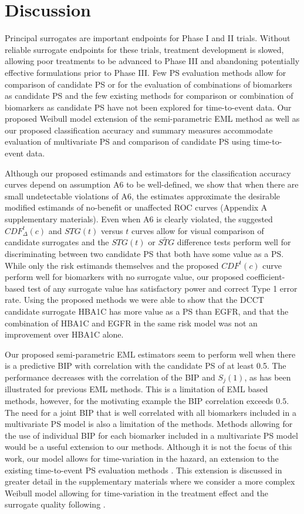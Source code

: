 \documentclass[times, doublespace]{simauth}
\begin{document}
\section{Discussion}
Principal surrogates are important endpoints for Phase I and II trials. Without reliable surrogate endpoints for these trials, treatment development is slowed, allowing poor treatments to be advanced to Phase III and abandoning potentially effective formulations prior to Phase III. Few PS evaluation methods allow for comparison of candidate PS or for the evaluation of combinations of biomarkers as candidate PS and the few existing methods for comparison or combination of biomarkers as candidate PS have not been explored for time-to-event data. Our proposed Weibull model extension of the \citet{Huang11} semi-parametric EML method as well as our proposed classification accuracy and summary measures accommodate evaluation of multivariate PS and comparison of candidate PS using time-to-event data. 

Although our proposed estimands and estimators for the classification accuracy curves depend on assumption A6 to be well-defined, we show that when there are small undetectable violations of A6, the estimates approximate the desirable modified estimands of no-benefit or unaffected ROC curves (Appendix A supplementary materials). Even when A6 is clearly violated, the suggested $CDF^{t}_{\Delta}(c)$ and $STG(t)$ versus $t$ curves allow for visual comparison of candidate surrogates and the $STG(t)$ or $\widetilde{STG}$ difference tests perform well for discriminating between two candidate PS that both have some value as a PS. While only the risk estimands themselves and the proposed $CDF^{t}(c)$ curve perform well for biomarkers with no surrogate value, our proposed coefficient-based test of any surrogate value has satisfactory power and correct Type 1 error rate. Using the proposed methods we were able to show that the DCCT candidate surrogate HBA1C has more value as a PS than EGFR, and that the combination of HBA1C and EGFR in the same risk model was not an improvement over HBA1C alone.

Our proposed semi-parametric EML estimators seem to perform well when there is a predictive BIP with correlation with the candidate PS of at least 0.5. The performance decreases with the correlation of the BIP and $S_j(1)$, as has been illustrated for previous EML methods. This is a limitation of EML based methods, however, for the motivating example the BIP correlation exceeds $0.5$. The need for a joint BIP that is well correlated with all biomarkers included in a multivariate PS model is also a limitation of the methods. Methods allowing for the use of individual BIP for each biomarker included in a multivariate PS model would be a useful extension to our methods. Although it is not the focus of this work, our model allows for time-variation in the hazard, an extension to the existing time-to-event PS evaluation methods \citep{Qin07, Miao13}. This extension is discussed in greater detail in the supplementary materials where we consider a more complex Weibull model allowing for time-variation in the treatment effect and the surrogate quality following \citet{Gabriel13}.




%

\end{document}
